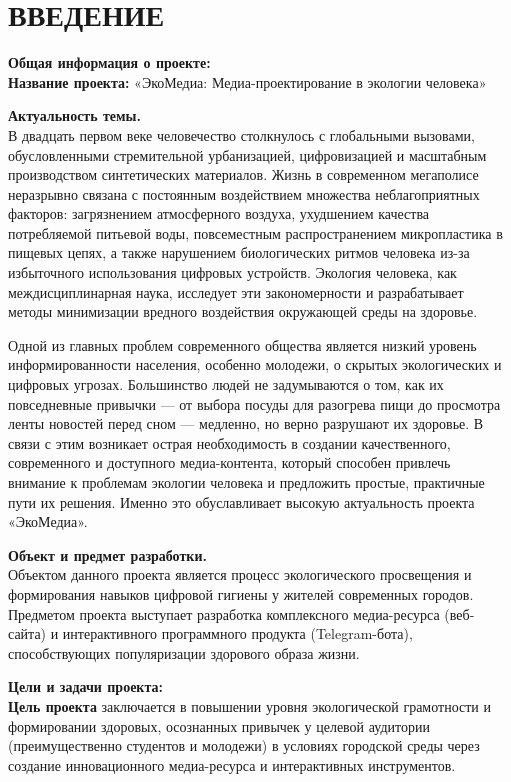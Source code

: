\section*{ВВЕДЕНИЕ}

\textbf{Общая информация о проекте:}\\
\textbf{Название проекта:} «ЭкоМедиа: Медиа-проектирование в экологии человека»

\textbf{Актуальность темы.}\\
В двадцать первом веке человечество столкнулось с глобальными вызовами, обусловленными стремительной урбанизацией, цифровизацией и масштабным производством синтетических материалов. Жизнь в современном мегаполисе неразрывно связана с постоянным воздействием множества неблагоприятных факторов: загрязнением атмосферного воздуха, ухудшением качества потребляемой питьевой воды, повсеместным распространением микропластика в пищевых цепях, а также нарушением биологических ритмов человека из-за избыточного использования цифровых устройств. Экология человека, как междисциплинарная наука, исследует эти закономерности и разрабатывает методы минимизации вредного воздействия окружающей среды на здоровье.

Одной из главных проблем современного общества является низкий уровень информированности населения, особенно молодежи, о скрытых экологических и цифровых угрозах. Большинство людей не задумываются о том, как их повседневные привычки — от выбора посуды для разогрева пищи до просмотра ленты новостей перед сном — медленно, но верно разрушают их здоровье. В связи с этим возникает острая необходимость в создании качественного, современного и доступного медиа-контента, который способен привлечь внимание к проблемам экологии человека и предложить простые, практичные пути их решения. Именно это обуславливает высокую актуальность проекта «ЭкоМедиа».

\textbf{Объект и предмет разработки.}\\
Объектом данного проекта является процесс экологического просвещения и формирования навыков цифровой гигиены у жителей современных городов. Предметом проекта выступает разработка комплексного медиа-ресурса (веб-сайта) и интерактивного программного продукта (Telegram-бота), способствующих популяризации здорового образа жизни.

\textbf{Цели и задачи проекта:}\\
\textbf{Цель проекта} заключается в повышении уровня экологической грамотности и формировании здоровых, осознанных привычек у целевой аудитории (преимущественно студентов и молодежи) в условиях городской среды через создание инновационного медиа-ресурса и интерактивных инструментов.

